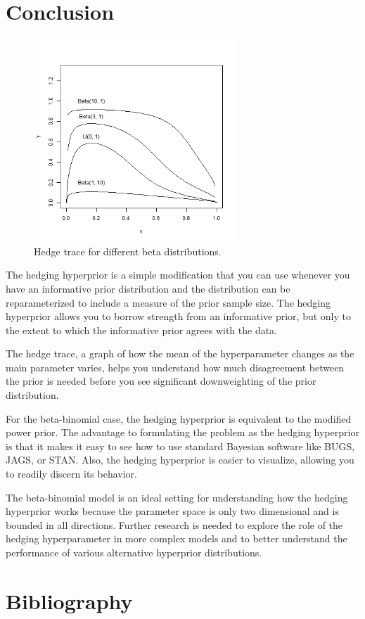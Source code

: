 \documentclass[12pt]{article}
\begin{document}
\section{Conclusion}\begin{figure}
\begin{center}
\includegraphics[width=3in]{fig10.png}
\end{center}
\caption{Hedge trace for different beta distributions. \label{fig:hedge_trace}}
\end{figure}

\label{sec:conc}

The hedging hyperprior is a simple modification that you can use whenever you have an informative prior distribution and the distribution can be reparameterized to include a measure of the prior sample size. The hedging hyperprior allows you to borrow strength from an informative prior, but only to the extent to which the informative prior agrees with the data.

The hedge trace, a graph of how the mean of the hyperparameter changes as the main parameter varies, helps you understand how much disagreement between the prior is needed before you see significant downweighting of the prior distribution.

For the beta-binomial case, the hedging hyperprior is equivalent to the modified power prior. The advantage to formulating the problem as the hedging hyperprior is that it makes it easy to see how to use standard Bayesian software like BUGS, JAGS, or STAN. Also, the hedging hyperprior is easier to visualize, allowing you to readily discern its behavior.

The beta-binomial model is an ideal setting for understanding how the hedging hyperprior works because the parameter space is only two dimensional and is bounded in all directions. Further research is needed to explore the role of the hedging hyperparameter in more complex models and to better understand the performance of various alternative hyperprior distributions.

\section{Bibliography}




\end{document}
